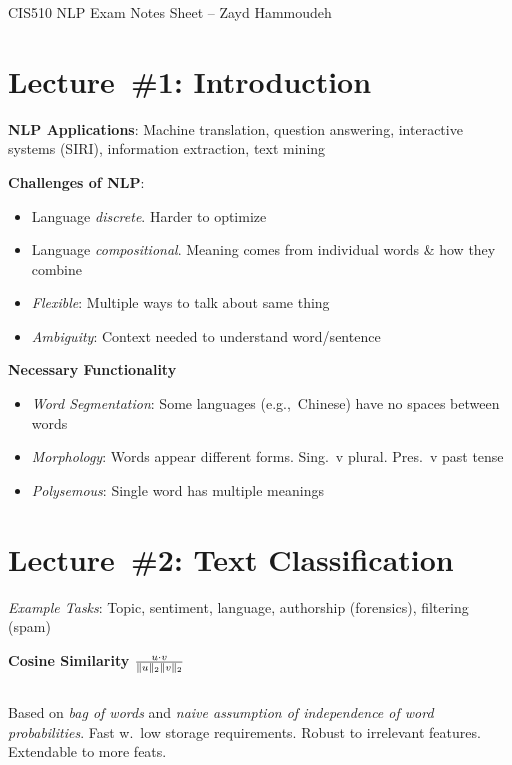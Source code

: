 \documentclass[9pt]{extarticle}
\renewcommand{\green}[1]{{\color{ForestGreen} #1}}
\begin{document}
\begin{center}
CIS510 NLP Exam Notes Sheet -- Zayd Hammoudeh
\end{center}
\begin{multicols}{3}
  \section*{Lecture~\#1: Introduction}

  \textbf{NLP Applications}: Machine translation, question answering, interactive systems (SIRI), information extraction, text mining

  \textbf{Challenges of NLP}:
  \begin{itemize}
    \item Language \textit{discrete}. Harder to optimize
    \item Language \textit{compositional}. Meaning comes from individual words \& how they combine
    \item \textit{Flexible}: Multiple ways to talk about same thing
    \item \textit{Ambiguity}: Context needed to understand word/sentence
  \end{itemize}

  \textbf{Necessary Functionality}
  \begin{itemize}
    \item \textit{Word Segmentation}: Some languages (e.g.,~Chinese) have no spaces between words
    \item \textit{Morphology}: Words appear different forms. Sing.\ v plural. Pres.\ v past tense
    \item \textit{Polysemous}: Single word has multiple meanings
  \end{itemize}

  \section*{Lecture~\#2: Text Classification}
  \textit{Example Tasks}: Topic, sentiment, language, authorship (forensics), filtering (spam)

  \textbf{\green{Cosine Similarity}} $\frac{u \cdot v}{\lVert u\rVert_{2} \lVert v\rVert_{2}}$

  \subsection*{}

  Based on \textit{bag of words} and \textit{naive assumption of independence of word probabilities}. Fast w.\ low storage requirements. Robust to irrelevant features. Extendable to more feats.


\end{multicols}
\end{document}
